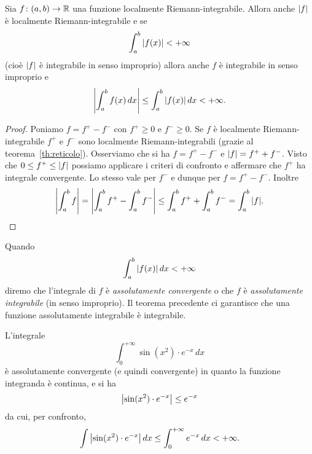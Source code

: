 \begin{theorem}
\label{th:convergenza_assoluta_integrale}
\mymark{**}%
Sia $f\colon (a,b)\to \mathbb R$ una funzione localmente Riemann-integrabile.
Allora anche ${\left|f\right|}$ è localmente Riemann-integrabile e se
\[
\int_a^b {\left|f(x)\right|} < +\infty
\]
(cioè ${\left|f\right|}$ è integrabile in senso improprio)
allora anche $f$ è integrabile in senso improprio e
\[
  {\left|\int_a^b f(x)\,dx\right|}
  \le \int_a^b {\left|f(x)\right|}\, dx < +\infty.
\]
\end{theorem}
%
%
\begin{proof}
Poniamo $f = f^+ - f^-$ con $f^+\ge 0$ e $f^-\ge 0$.
Se $f$ è localmente Riemann-integrabile
$f^+$ e $f^-$ sono localmente Riemann-integrabili
(grazie al teorema~\ref{th:reticolo}).
Osserviamo che si ha $f = f^+ - f^-$
e ${\left|f\right|} = f^+ + f^-$.
Visto che $0\le f^+ \le {\left|f\right|}$ possiamo
applicare i criteri di confronto e
affermare che $f^+$ ha integrale convergente.
Lo stesso vale per $f^-$ e dunque per $f=f^+ - f^-$.
Inoltre
\[
  {\left|\int_a^b f \right|}
  = {\left|\int_a^b f^+ - \int_a^b f^-\right|}
  \le \int_a^b f^+ + \int_a^b f^-
  = \int_a^b {\left|f\right|}.
\]
\end{proof}

\begin{definition}
%
%
%
%
%
Quando
\[
  \int_a^b {\left|f(x)\right|}\, dx <+\infty
\]
diremo che l'integrale di $f$ è \emph{assolutamente convergente}
o che $f$ è \emph{assolutamente integrabile} (in senso improprio).
Il teorema
precedente ci garantisce che una funzione assolutamente integrabile
è integrabile.
\end{definition}

\begin{example}
L'integrale
\[
  \int_0^{+\infty} \sin(x^2)\cdot e^{-x}\, dx
\]
è assolutamente convergente (e quindi convergente)
in quanto la funzione integranda è continua,
e si ha
\[
 {\left|\sin(x^2)\cdot e^{-x}\right|} \le e^{-x}
\]
da cui, per confronto,
\[
 \int {\left|\sin(x^2)\cdot e^{-x}\right|}\, dx  \le
  \int_0^{+\infty} e^{-x}\, dx < +\infty.
\]
\end{example}

